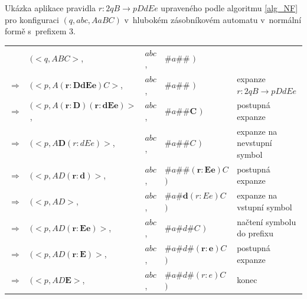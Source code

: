 \begin{Example}
Ukázka aplikace pravidla $r: 2q B \rightarrow p DdEe$ upraveného podle algoritmu \ref{alg_NF} pro konfiguraci $(q, abc, AaBC)$ v~hlubokém zásobníkovém automatu v~normální formě s~prefixem 3.




\begin{center}
\begin{tabular}{llll|l}
                & $( <q, ABC>$,              & $abc$, & $\#a\#\#$                    $)$ &  \\
$\Rightarrow$   & $( <p, A\mathbf{(r: DdEe)}C>$,      & $abc$, & $\#a\#\#$           $)$ & expanze $r: 2q B \rightarrow p DdEe$\\
$\Rightarrow$   & $( <p, A\mathbf{(r: D) (r: dEe)}>$, & $abc$, & $\#a\#\#\mathbf{C}$ $)$ & postupná expanze\\
$\Rightarrow$   & $( <p, A\mathbf{D}(r: dEe)>$,       & $abc$, & $\#a\#\#C$          $)$ & expanze na nevstupní symbol\\
$\Rightarrow$   & $( <p, AD\mathbf{(r: d)}>$,         & $abc$, & $\#a\#\#\mathbf{(r: Ee)}C$   $)$ & postupná expanze \\
$\Rightarrow$   & $( <p, AD>$,               & $abc$, & $\#a\#\mathbf{d}(r: Ee)C$    $)$        & expanze na vstupní symbol\\
$\Rightarrow$   & $( <p, AD\mathbf{(r: Ee)}>$,        & $abc$, & $\#a\#d\mathbf{\#}C$   $)$     & načtení symbolu do prefixu\\
$\Rightarrow$   & $( <p, AD\mathbf{(r: E)}>$,         & $abc$, & $\#a\#d\#\mathbf{(r: e)}C$ $)$  & postupná expanze\\
$\Rightarrow$   & $( <p, AD\mathbf{E}>$,         & $abc$, & $\#a\#d\#(r: e)C$        $)$        & konec

\end{tabular}
\end{center}

\end{Example}






